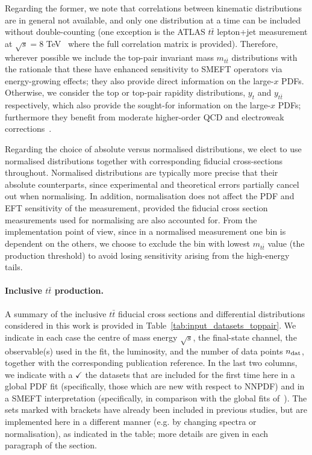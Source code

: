 \documentclass[withindex,glossary]{cam-thesis}
\begin{document}
Regarding the former, we note that correlations between
 kinematic distributions are in general not available, and only one
 distribution at a time can be included without double-counting 
 (one exception is the ATLAS $t\bar{t}$ lepton+jet measurement
 at $\sqrt{s}=8$ TeV~\cite{Aad:2015mbv}
 where the full correlation matrix is provided). Therefore, wherever
 possible we include the top-pair invariant mass $m_{t\bar{t}}$ distributions
 with the rationale that these have enhanced sensitivity to SMEFT
 operators via energy-growing effects; they also provide
 direct information on the large-$x$ PDFs.
 Otherwise, we consider the top or top-pair rapidity distributions,
 $y_{t}$ and $y_{t\bar{t}}$ respectively, which also provide
 the sought-for information on the large-$x$ PDFs;
 furthermore they benefit from moderate
higher-order QCD and electroweak corrections~\cite{Czakon:2016olj}.

Regarding the choice of absolute versus normalised distributions, we elect to use normalised
distributions together with corresponding fiducial cross-sections throughout.
%
Normalised distributions are typically more precise that their absolute counterparts, since
experimental and theoretical errors partially cancel out when normalising.
%
In addition, normalisation does not affect the PDF and EFT sensitivity of the measurement,
provided the fiducial cross section measurements used for normalising are also accounted for.
%
%
From the implementation point of view, since in a normalised measurement one bin is dependent on the others,
we choose to exclude the bin with lowest $m_{t\bar{t}}$ value (the production threshold) to avoid
losing sensitivity arising from the high-energy tails.

\paragraph{Inclusive $t\bar{t}$ production.}
A summary of the inclusive $t\bar{t}$ fiducial cross sections
and differential distributions considered in this work is provided
in Table~\ref{tab:input_datasets_toppair}.
%
We indicate in each case
 the centre of mass energy $\sqrt{s}$, the final-state
 channel, the observable(s) used in the fit, the luminosity, and the
 number of data points $n_{\rm dat}$, together
 with the corresponding publication reference.
 In the last two columns, we indicate
 with a $\checkmark$ the datasets
 that are included for the first time here in a global PDF fit (specifically, those which
 are new with respect to NNPDF)
 and in a SMEFT interpretation (specifically, in comparison
 with the global fits of~\cite{Ellis:2020unq,Ethier:2021bye}).
 The sets marked with brackets have already been included in
 previous studies, but are implemented here in a different manner
 (e.g. by changing spectra or normalisation), as indicated in the
 table; more details are given in each paragraph of the section. 
\end{document}
